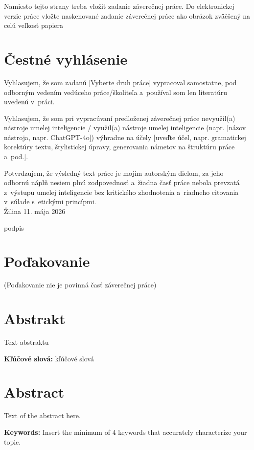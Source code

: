 \newpage %
\thispagestyle{empty}
\begingroup
\begin{LARGE}
	Namiesto tejto strany treba vložiť zadanie záverečnej práce.
	Do elektronickej verzie práce vložte naskenované zadanie záverečnej práce ako obrázok zväčšený na celú veľkosť papiera
\end{LARGE}
\endgroup

\newpage %
\pagestyle{fancy}
\mbox{}
\vfill
\section*{Čestné vyhlásenie}
Vyhlasujem, že som zadanú [Vyberte druh práce] vypracoval samostatne, pod odborným vedením vedúceho práce/školiteľa a~používal som len literatúru uvedenú v~práci.

Vyhlasujem, že som pri vypracúvaní predloženej záverečnej práce nevyužil(a) nástroje umelej inteligencie / využil(a) nástroje umelej inteligencie (napr. [názov nástroja, napr. ChatGPT-4o]) výhradne na účely [uveďte účel, napr. gramatickej korektúry textu, štylistickej úpravy, generovania námetov na štruktúru práce a~pod.].

Potvrdzujem, že výsledný text práce je mojim autorským dielom, za jeho odbornú náplň nesiem plnú zodpovednosť a~žiadna časť práce nebola prevzatá z~výstupu umelej inteligencie bez kritického zhodnotenia a~riadneho citovania v~súlade s~etickými princípmi.
\vspace*{0.25cm}
\\Žilina 11. mája 2026

\vspace*{.5cm}
\null\hfill podpis

\newpage %
\mbox{}
\vfill
\section*{Poďakovanie}
(Poďakovanie nie je povinná časť záverečnej práce)
\vspace{2cm}

\newpage %
\section*{Abstrakt}

Text abstraktu

\vspace{0.5cm}
\noindent\textbf{Kľúčové slová:} kľúčové slová \\

\section*{Abstract}

Text of the abstract here.

\vspace{0.5cm}
\noindent\textbf{Keywords:} Insert the minimum of 4 keywords that accurately characterize your topic.
